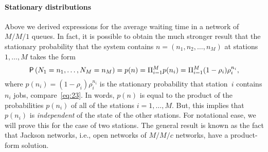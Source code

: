 \paragraph{Stationary distributions}

Above we derived expressions for the average waiting time in a network of $M/M/1$ queues.
In fact, it is possible to obtain the much stronger result that the stationary probability that the system contains $n=(n_1,n_2, \ldots, n_M)$ at stations $1,\ldots, M$ takes the form
\begin{equation*}
  \P{N_1=n_1, \ldots, N_M=n_M} = p(n) = \Pi_{i=1}^M p(n_i) = \Pi_{i=1}^M (1-\rho_i)\rho_i^{n_i},
\end{equation*}
where $p(n_i)=(1-\rho_i)\rho_i^{n_i}$ is the stationary probability that station~$i$ contains $n_i$ jobs, compare~\cref{eq:23}.
In words, $p(n)$ is equal to the product of the probabilities $p(n_i)$ of all of the stations $i=1,\ldots,M$.
But, this implies that $p(n_i)$ is \emph{independent} of the state of the other stations.
For notational ease, we will prove this for the case of two stations.
The general result is known as the fact that Jackson networks, i.e., open networks of $M/M/c$ networks, have a product-form solution.









